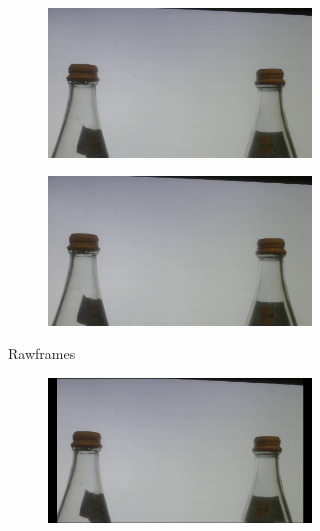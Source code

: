\begin{figure}[!tbp]
\begin{subfigure}[b]{\textwidth}
\begin{subfigure}[b]{0.180\textwidth}
        \end{subfigure}
        \begin{subfigure}[b]{0.180\textwidth}%
          \includegraphics[width=1\linewidth]{images/results/prestab-3.jpg}
        \end{subfigure}
        \begin{subfigure}[b]{0.180\textwidth}%
          \includegraphics[width=1\linewidth]{images/results/prestab-4.jpg}
        \end{subfigure}
    \caption{Rawframes}
    \end{subfigure}
    \begin{subfigure}[b]{\textwidth}%
        \begin{subfigure}[b]{0.180\textwidth}%
          \includegraphics[width=1\linewidth]{images/results/poststab-0.jpg}

\end{subfigure}
\end{subfigure}
\end{figure}
